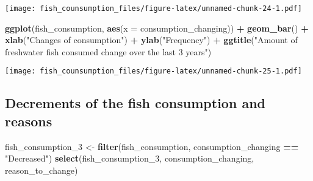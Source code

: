 \documentclass[
]{article}
\newenvironment{Shaded}{\begin{snugshade}}{\end{snugshade}}
\newcommand{\AttributeTok}[1]{\textcolor[rgb]{0.13,0.29,0.53}{#1}}
\newcommand{\FunctionTok}[1]{\textcolor[rgb]{0.13,0.29,0.53}{\textbf{#1}}}
\newcommand{\NormalTok}[1]{#1}
\newcommand{\OtherTok}[1]{\textcolor[rgb]{0.56,0.35,0.01}{#1}}
\newcommand{\SpecialCharTok}[1]{\textcolor[rgb]{0.81,0.36,0.00}{\textbf{#1}}}
\newcommand{\StringTok}[1]{\textcolor[rgb]{0.31,0.60,0.02}{#1}}
\begin{document}
\texttt{[image: fish\_counsumption\_files/figure-latex/unnamed-chunk-24-1.pdf]}

\begin{Shaded}
\begin{Highlighting}[]
\FunctionTok{ggplot}\NormalTok{(fish\_consumption, }\FunctionTok{aes}\NormalTok{(}\AttributeTok{x =}\NormalTok{ consumption\_changing)) }\SpecialCharTok{+}
  \FunctionTok{geom\_bar}\NormalTok{() }\SpecialCharTok{+}
  \FunctionTok{xlab}\NormalTok{(}\StringTok{"Changes of consumption"}\NormalTok{) }\SpecialCharTok{+}
  \FunctionTok{ylab}\NormalTok{(}\StringTok{"Frequency"}\NormalTok{) }\SpecialCharTok{+}
  \FunctionTok{ggtitle}\NormalTok{(}\StringTok{"Amount of freshwater fish consumed change over the last 3 years"}\NormalTok{)}
\end{Highlighting}
\end{Shaded}

\texttt{[image: fish\_counsumption\_files/figure-latex/unnamed-chunk-25-1.pdf]}

\hypertarget{decrements-of-the-fish-consumption-and-reasons}{%
\subsection{Decrements of the fish consumption and
reasons}\label{decrements-of-the-fish-consumption-and-reasons}}

\begin{Shaded}
\begin{Highlighting}[]
\NormalTok{fish\_consumption\_3 }\OtherTok{\textless{}{-}} \FunctionTok{filter}\NormalTok{(fish\_consumption, consumption\_changing }\SpecialCharTok{==} \StringTok{"Decreased"}\NormalTok{)}
                         \FunctionTok{select}\NormalTok{(fish\_consumption\_3, consumption\_changing, reason\_to\_change)}
\end{Highlighting}
\end{Shaded}
\end{document}
